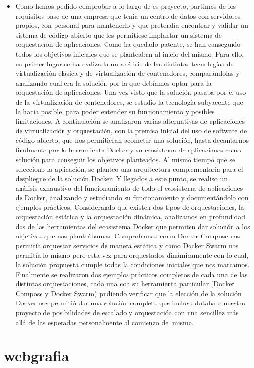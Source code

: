 \documentclass[%
 reprint,
 amsmath,amssymb,
 aps,
]{revtex4-1}
\begin{document}
\begin{itemize}
\item Como hemos podido comprobar a lo largo de es proyecto, partimos de los requisitos base de una
empresa que tenia un centro de datos con servidores propios, con personal para mantenerlo y que
pretendía encontrar y validar un sistema de código abierto que les permitiese implantar un sistema
de orquestación de aplicaciones.
Como ha quedado patente, se han conseguido todos los objetivos iniciales que se planteaban al
inicio del mismo.
Para ello, en primer lugar se ha realizado un análisis de las distintas tecnologías de virtualización
clásica y de virtualización de contenedores, comparándolas y analizando cual era la solución por
la que debíamos optar para la orquestación de aplicaciones. Una vez visto que la solución pasaba
por el uso de la virtualización de contenedores, se estudio la tecnología subyacente que la hacia
posible, para poder entender su funcionamiento y posibles limitaciones. A continuación se
analizaron varias alternativas de aplicaciones de virtualización y orquestación, con la premisa
inicial del uso de software de código abierto, que nos permitieran acometer una solución, hasta
decantarnos finalmente por la herramienta Docker y su ecosistema de aplicaciones como solución
para conseguir los objetivos planteados.
Al mismo tiempo que se selecciono la aplicación, se planteo una arquitectura complementaria para
el despliegue de la solución Docker.
Y llegados a este punto, se realizo un análisis exhaustivo del funcionamiento de todo el
ecosistema de aplicaciones de Docker, analizando y estudiando su funcionamiento y
documentándolo con ejemplos prácticos.
Considerando que existen dos tipos de orquestaciones, la orquestación estática y la orquestación
dinámica, analizamos en profundidad dos de las herramientas del ecosistema Docker que
permiten dar solución a los objetivos que nos planteábamos: Comprobamos como Docker
Compose nos permitía orquestar servicios de manera estática y como Docker Swarm nos permitía
lo mismo pero esta vez para orquestados dinámicamente con lo cual, la solución propuesta
cumple todas la condiciones iniciales que nos marcamos.
Finalmente se realizaron dos ejemplos prácticos completos de cada una de las distintas
orquestaciones, cada una con su herramienta particular (Docker Compose y Docker Swarm)
pudiendo verificar que la elección de la solución Docker nos permitió dar una solución completa
que incluso dotaba a nuestro proyecto de posibilidades de escalado y orquestación con una
sencillez más allá de las esperadas personalmente al comienzo del mismo.

\end{itemize}

\section{webgrafia}\label{sec:9}



\end{document}
